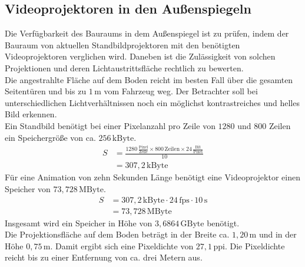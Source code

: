 \subsection{Videoprojektoren in den Außenspiegeln}
Die Verfügbarkeit des Bauraums in dem Außenspiegel ist zu prüfen, indem der Bauraum von aktuellen Standbildprojektoren mit den benötigten Videoprojektoren verglichen wird. 
Daneben ist die Zulässigkeit von solchen Projektionen und deren Lichtaustrittsfläche rechtlich zu bewerten. \\
Die angestrahlte Fläche auf dem Boden reicht im besten Fall über die gesamten Seitentüren und bis zu $ 1\,\mathrm{m} $ vom Fahrzeug weg.
Der Betrachter soll bei unterschiedlichen Lichtverhältnissen noch ein möglichst kontrastreiches und helles Bild erkennen. \\
Ein Standbild benötigt bei einer Pixelanzahl pro Zeile von $ 1280 $ und $ 800 $ Zeilen ein Speichergröße von ca. $ 256\,\mathrm{kByte}$. 
\begin{align}
	S &= \frac{1280\,\frac{\mathrm{Pixel}}{\mathrm{Zeile}} \times 800\,\mathrm{Zeilen} \times 24\,\frac{\mathrm{Bit}}{\mathrm{Pixel}}}{10} \\
	&= 307,2\,\mathrm{kByte}
\end{align}
Für eine Animation von zehn Sekunden Länge benötigt eine Videoprojektor einen Speicher von $ 73,728\,\mathrm{MByte}$.
\begin{align}
	S &= 307,2\,\mathrm{kByte} \cdot 24\,\mathrm{fps} \cdot 10\,\mathrm{s}\\
	&= 73,728\,\mathrm{MByte} 
\end{align}
Insgesamt wird ein Speicher in Höhe von $ 3,6864\,\mathrm{GByte} $ benötigt. \\
Die Projektionsfläche auf dem Boden beträgt in der Breite ca. $ 1,20\,\mathrm{m} $ und in der Höhe $ 0,75\,\mathrm{m} $. Damit ergibt sich eine Pixeldichte von $ 27,1\,\mathrm{ppi} $. Die Pixeldichte reicht bis zu einer Entfernung von ca. drei Metern aus.
